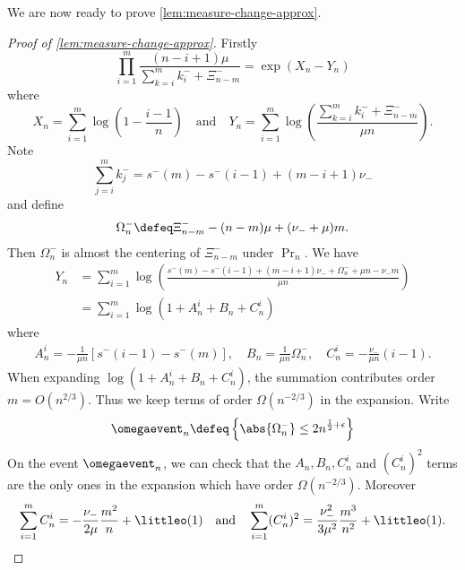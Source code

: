 We are now ready to prove \cref{lem:measure-change-approx}.
\begin{proof}[Proof of \cref{lem:measure-change-approx}]
    Firstly
    \begin{equation*}
        \prod_{i=1}^m \frac{(n-i+1)\mu}{\sum_{k=i}^m k^-_i + \Xi^-_{n-m}} = \exp(X_n - Y_n)
    \end{equation*}
    where
    \begin{equation*}
        X_n = \sum_{i=1}^m \log\left( 1 - \frac{i-1}{n} \right)
        \quad \text{and} \quad
        Y_n = \sum_{i=1}^m \log\left( \frac{\sum_{k=i}^m k_i^- + \Xi^-_{n-m}}{\mu n} \right).
    \end{equation*}
    Note
    \begin{equation*}
        \sum_{j=i}^m k^-_j = s^-(m) - s^-(i - 1) + (m - i + 1) \nu_-
    \end{equation*}
    and define
    \begin{equation*}
        \Omega^-_n \defeq \Xi^-_{n-m} - (n-m)\mu + (\nu_- + \mu)m.
    \end{equation*}
    Then $\Omega_n^-$ is almost the centering of $\Xi_{n-m}^-$ under $\Pr_n$. We have
    \begin{align*}
        Y_n 
        &= \sum_{i=1}^m \log \left( \frac{s^-(m) - s^-(i-1) + (m - i + 1) \nu_- + \Omega^-_n + \mu n - \nu_- m}{\mu n} \right) \\
        &= \sum_{i=1}^m \log \left( 1 + A_n^i + B_n + C_n^i \right)
    \end{align*}
    where
    \begin{align*}
        A_n^i = - \frac{1}{\mu n} \left[ s^-(i-1) - s^-(m) \right], \quad
        B_n = \frac{1}{\mu n} \Omega^-_n, \quad
        C_n^i = - \frac{\nu_-}{\mu n} (i-1).
    \end{align*}
    When expanding $\log(1 + A_n^i + B_n + C_n^i)$, the summation contributes order $m = O(n^{2/3})$. Thus we keep terms of order $\Omega(n^{-2/3})$ in the expansion. Write
    \begin{equation*}
        \omegaevent_n \defeq \left\{ \abs{\Omega^-_n} \leq 2n^{\frac{1}{2} + \epsilon} \right\}
    \end{equation*}
    On the event $\omegaevent_n$, we can check that the $A_n, B_n, C_n^i$ and $(C_n^i)^2$ terms are the only ones in the expansion which have order $\Omega(n^{-2/3})$. Moreover
    \begin{equation*}
        \sum_{i=1}^m C_n^i = - \frac{\nu_-}{2 \mu} \frac{m^2}{n} + \littleo(1) \quad \text{and} \quad
        \sum_{i=1}^m (C_n^i)^2 = \frac{\nu_-^2}{3 \mu^2} \frac{m^3}{n^2} + \littleo(1).

\end{equation*}
\end{proof}
